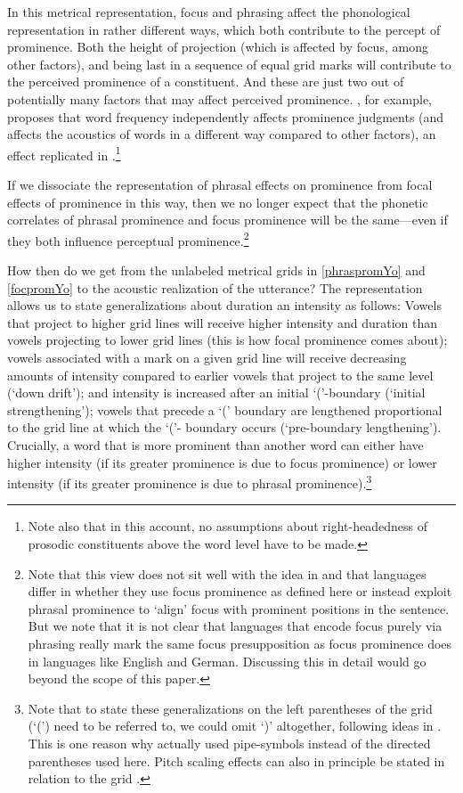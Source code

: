 \documentclass[preprint,review,12pt,authoryear,times]{elsarticle}
\begin{document}
In this metrical representation, focus and phrasing affect the phonological representation in rather different ways, which both contribute to the percept of prominence. Both the height of projection (which is affected by focus, among other factors), and being last in a sequence of equal grid marks will contribute to the perceived prominence of a constituent. And these are just two out of potentially many factors that may affect perceived prominence. \citet{cole10rapid}, for example, proposes that word frequency independently affects prominence judgments (and affects the acoustics of words in a different way compared to other factors), an effect replicated in \citet{bisho19}.\footnote{Note also that in this account, no assumptions about right-headedness of prosodic constituents above the word level have to be made.}

If we dissociate the representation of phrasal effects on prominence from focal effects of prominence in this way, then we no longer expect  that the phonetic correlates of phrasal prominence and focus prominence will be the same---even if they both influence perceptual prominence.\footnote{Note that this view does not sit well with the idea in \citet{burin10} and \citet{fery13} that languages differ in whether they use focus prominence as defined here or instead exploit phrasal prominence to `align' focus with prominent positions in the sentence. But we note that it is not clear that languages that encode focus purely via phrasing really mark the same focus presupposition as focus prominence does in languages like English and German. Discussing this in detail would go beyond the scope of this paper.} 

How then do we get from the unlabeled metrical grids in \ref{phraspromYo} and  \ref{focpromYo} to the acoustic realization of the utterance? The representation allows us to state generalizations about duration an intensity as follows: Vowels that project to higher grid lines will receive higher intensity and duration than vowels projecting to lower grid lines (this is how focal prominence comes about); vowels associated with a mark on a given grid line will receive decreasing amounts of intensity compared to earlier vowels that project to the same level (`down drift'); and intensity is increased after an initial `('-boundary  (`initial strengthening'); vowels that precede a `(' boundary are lengthened proportional to the grid line at which the `('- boundary occurs (`pre-boundary lengthening'). Crucially, a word that is more prominent than another word can either have higher intensity (if its greater prominence is due to focus prominence) or lower intensity (if its greater prominence is due to phrasal prominence).\footnote{ Note that to state these generalizations on the left parentheses of the grid (`(') need to be referred to, we could omit `)' altogether, following ideas in \citet{idsar92}. This is one reason why \citet{wagner05recursion} actually used pipe-symbols instead of the directed parentheses used here. Pitch scaling effects can also in principle be stated in relation to the grid \citep[see][140{\em ff }]{wagner05recursion}.} 
\end{document}
